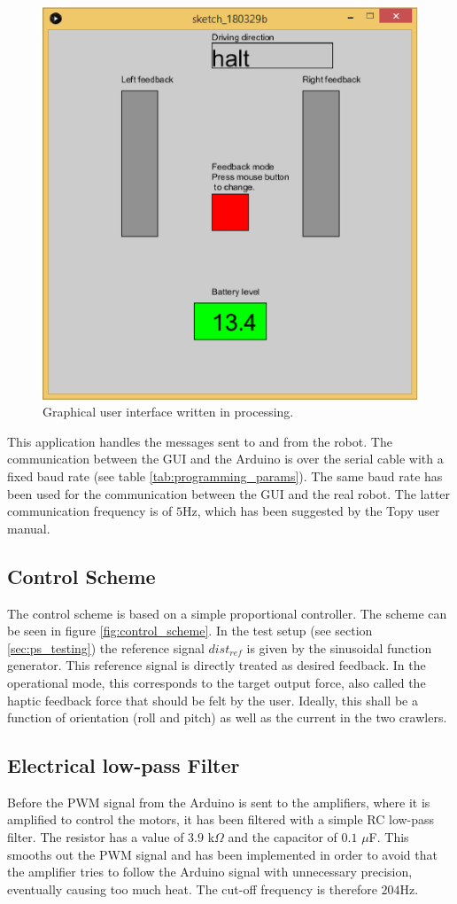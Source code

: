 \begin{figure}[h!]
	\centering
	\includegraphics[width=0.4\linewidth]{Figs/processing_gui}
	\caption{Graphical user interface written in processing.}	\label{fig:processing_gui}
\end{figure}

This application handles the messages sent to and from the robot. The communication between the GUI and the Arduino is over the serial cable with a fixed baud rate (see table \ref{tab:programming_params}). The same baud rate has been used for the communication between the GUI and the real robot. The latter communication frequency is of $5$Hz, which has been suggested by the Topy user manual. 
	
\subsection{Control Scheme}
The control scheme is based on a simple proportional controller. The scheme can be seen in figure \ref{fig:control_scheme}. In the test setup (see section \ref{sec:ps_testing}) the reference signal $dist_{ref}$ is given by the sinusoidal function generator. This reference signal is directly treated as desired feedback. In the operational mode, this corresponds to the target output force, also called the haptic feedback force that should be felt by the user. Ideally, this shall be a function of orientation (roll and pitch) as well as the current in the two crawlers.
	
\subsection{Electrical low-pass Filter}
Before the PWM signal from the Arduino is sent to the amplifiers, where it is amplified to control the motors, it has been filtered with a simple RC low-pass filter. The resistor has a value of $3.9$ k$\Omega$ and the capacitor of $0.1$ $\mu$F. This smooths out the PWM signal and has been implemented in order to avoid that the amplifier tries to follow the Arduino signal with unnecessary precision, eventually causing too much heat. The cut-off frequency is therefore $ 204$Hz.




\newpage